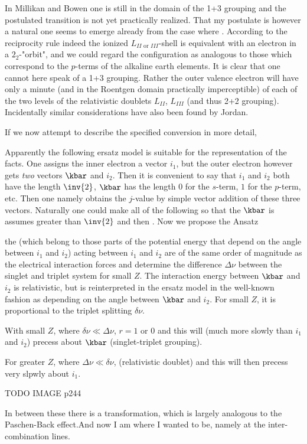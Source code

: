 In Millikan and Bowen one is still in the domain of the 1+3 grouping and the postulated transition is not yet practically realized. That my postulate is however a natural one seems to emerge already from the case where . According to the reciprocity rule indeed the ionized $L_{II \text{ or } III}$-shell is equivalent with an electron in a $2_2$-"orbit", and we could regard the configuration as analogous to those which correspond to the $p$-terms of the alkaline earth elements. It is clear that one cannot here speak of a 1+3 grouping. Rather the outer valence electron will have only a minute (and in the Roentgen domain practically imperceptible)  of each of the two levels of the relativistic doublets $L_{II}$, $L_{III}$ (and thus 2+2 grouping). Incidentally similar considerations have also been found by Jordan.

If we now attempt to describe the specified conversion in more detail, 


Apparently the following ersatz model is suitable for the representation of the facts. One assigns the inner electron a vector $i_1$, but the outer electron however gets \textit{two} vectors $\kbar$ and $i_2$. Then it is convenient to say that $i_1$ and $i_2$ both have the length $\inv{2}$, $\kbar$ has the length $0$ for the $s$-term, $1$ for the $p$-term, etc. Then one namely obtains the $j$-value by simple vector addition of these three vectors. Naturally one could make all of the following so that the $\kbar$ is assumes greater than $\inv{2}$ and then . Now we propose the Ansatz

the  (which belong to those parts of the potential energy that depend on the angle between $i_1$ and $i_2$) acting between $i_1$ and $i_2$ are of the same order of magnitude as the electrical interaction forces and determine the difference $\Delta\nu$ between the singlet and triplet system for small $Z$. The interaction energy between $\kbar$ and $i_2$ is relativistic, but is reinterpreted in the ersatz model in the well-known fashion as depending on the angle between $\kbar$ and $i_2$. For small $Z$, it is proportional to the triplet splitting $\delta\nu$.

With small $Z$, where $\delta\nu \ll \Delta\nu$,  $r=1 \text{ or } 0$ and this will (much more slowly than $i_1$ and $i_2$) precess about $\kbar$ (singlet-triplet grouping).

For greater $Z$, where $\Delta\nu \ll \delta\nu$,  (relativistic doublet) and this will then precess very slpwly about $i_1$.

TODO IMAGE p244

In between these there is a transformation, which is largely analogous to the Paschen-Back effect.And now I am where I wanted to be, namely at the inter-combination lines.